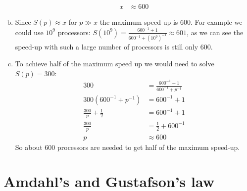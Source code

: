 \documentclass[a4paper]{article}
\begin{document}
\begin{enumerate}[(a)]
\begin{align*}
			x &\approx 600
		\end{align*}
	\item Since $S(p) \approx x$ for $p \gg x$ the maximum speed-up is 600. For example we could use $10^9$ processors: $\displaystyle S(10^9) = \frac{600^{-1} + 1}{600^{-1} + (10^9)^{-1}} \approx 601$, as we can see the speed-up with such a large number of processors is still only 600.
	\item To achieve half of the maximum speed up we would need to solve $S(p) = 300$:
		\begin{align*}
			300 &= \frac{600^{-1} + 1}{600^{-1} + p^{-1}} \\
			300 (600^{-1} + p^{-1}) &= 600^{-1} + 1 \\
			\frac{300}{p} + \frac{1}{2} &= 600^{-1} + 1 \\
			\frac{300}{p} &= \frac{1}{2} + 600^{-1} \\
			p &\approx 600
		\end{align*}
		So about 600 processors are needed to get half of the maximum speed-up.
\end{enumerate}

\section{Amdahl's and Gustafson's law}
\end{document}
